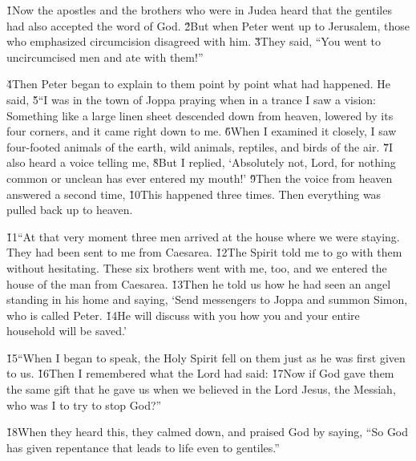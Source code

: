\v{1}Now the apostles and the brothers who were in Judea heard that the gentiles had also accepted the word of God. \v{2}But when Peter went up to Jerusalem, those who emphasized circumcision disagreed with him. \v{3}They said, ``You went to uncircumcised men and ate with them!''

\v{4}Then Peter began to explain to them point by point what had happened. He said, \v{5}``I was in the town of Joppa praying when in a trance I saw a vision: Something like a large linen sheet descended down from heaven, lowered by its four corners, and it came right down to me. \v{6}When I examined it closely, I saw four-footed animals of the earth, wild animals, reptiles, and birds of the air. \v{7}I also heard a voice telling me,  \v{8}But I replied, `Absolutely not, Lord, for nothing common or unclean has ever entered my mouth!' \v{9}Then the voice from heaven answered a second time,  \v{10}This happened three times. Then everything was pulled back up to heaven.

\v{11}``At that very moment three men arrived at the house where we were staying. They had been sent to me from Caesarea. \v{12}The Spirit told me to go with them without hesitating. These six brothers went with me, too, and we entered the house of the man from Caesarea. \v{13}Then he told us how he had seen an angel standing in his home and saying, `Send messengers to Joppa and summon Simon, who is called Peter. \v{14}He will discuss with you how you and your entire household will be saved.'

\v{15}``When I began to speak, the Holy Spirit fell on them just as he was first given to us. \v{16}Then I remembered what the Lord had said:    \v{17}Now if God gave them the same gift that he gave us when we believed in the Lord Jesus, the Messiah, who was I to try to stop God?''

\v{18}When they heard this, they calmed down, and praised God by saying, ``So God has given repentance that leads to life even to gentiles.''

